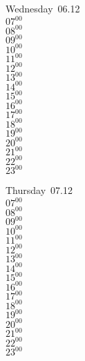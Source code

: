 \documentclass[11pt, a4paper]{book}\usepackage[]{graphicx}\usepackage[]{color}
\begin{document}
\begin{weekdaybox}
  Wednesday~06.12\\
  { 
  \vfill
  $07^{00}$\\
$08^{00}$\\
$09^{00}$\\
$10^{00}$\\
$11^{00}$\\
$12^{00}$\\
$13^{00}$\\
$14^{00}$\\
$15^{00}$\\
$16^{00}$\\
$17^{00}$\\
$18^{00}$\\
$19^{00}$\\
$20^{00}$\\
$21^{00}$\\
$22^{00}$\\
$23^{00}$\\
  }
\end{weekdaybox}
\clearpage
\begin{headerbox}
\end{headerbox}
\begin{weekdaybox}
  Thursday~07.12\\
  { 
  \vfill
  $07^{00}$\\
$08^{00}$\\
$09^{00}$\\
$10^{00}$\\
$11^{00}$\\
$12^{00}$\\
$13^{00}$\\
$14^{00}$\\
$15^{00}$\\
$16^{00}$\\
$17^{00}$\\
$18^{00}$\\
$19^{00}$\\
$20^{00}$\\
$21^{00}$\\
$22^{00}$\\
$23^{00}$\\
  }
\end{weekdaybox} 
\end{document}
